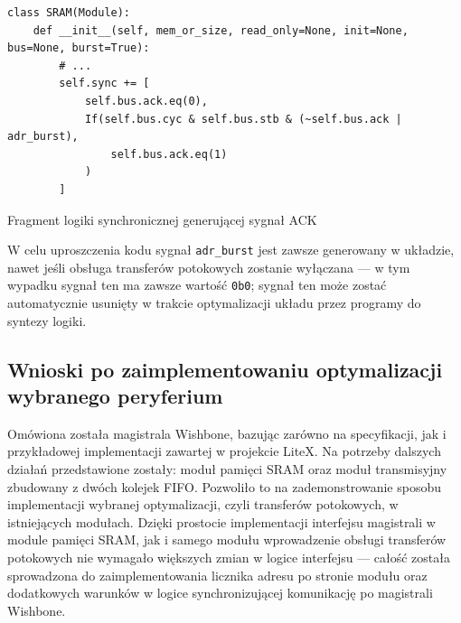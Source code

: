 \begin{listing}[H]
\begin{verbatim}
class SRAM(Module):
    def __init__(self, mem_or_size, read_only=None, init=None, bus=None, burst=True):
        # ...
        self.sync += [
            self.bus.ack.eq(0),
            If(self.bus.cyc & self.bus.stb & (~self.bus.ack | adr_burst),
                self.bus.ack.eq(1)
            )
        ]
\end{verbatim}
\caption{Fragment logiki synchronicznej generującej sygnał ACK}
\label{lst:impl-sram-ack}
\end{listing}

W celu uproszczenia kodu sygnał \texttt{adr_burst} jest zawsze generowany w układzie, nawet jeśli obsługa transferów potokowych zostanie wyłączana --- w tym wypadku sygnał ten ma zawsze wartość \texttt{0b0}; sygnał ten może zostać automatycznie usunięty w trakcie optymalizacji układu przez programy do syntezy logiki.

\subsection{Wnioski po zaimplementowaniu optymalizacji wybranego peryferium}

Omówiona została magistrala Wishbone, bazując zarówno na specyfikacji, jak i przykładowej implementacji zawartej w projekcie LiteX.
Na potrzeby dalszych działań przedstawione zostały: moduł pamięci SRAM oraz moduł transmisyjny zbudowany z dwóch kolejek FIFO. Pozwoliło to na zademonstrowanie sposobu implementacji wybranej optymalizacji, czyli transferów potokowych, w istniejących modułach.
Dzięki prostocie implementacji interfejsu magistrali w module pamięci SRAM, jak i samego modułu wprowadzenie obsługi transferów potokowych nie wymagało większych zmian w logice interfejsu --- całość została sprowadzona do zaimplementowania licznika adresu po stronie modułu oraz dodatkowych warunków w logice synchronizującej komunikację po magistrali Wishbone.
